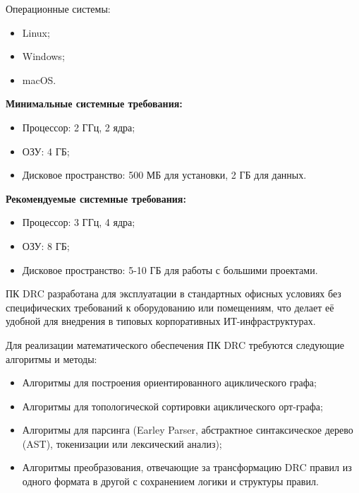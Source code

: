 Операционные системы:

\begin{itemize}
	\item Linux;
	\item Windows;
	\item macOS.
\end{itemize}

\textbf{Минимальные системные требования:}

\begin{itemize}
	\item Процессор: 2 ГГц, 2 ядра;
	\item ОЗУ: 4 ГБ;
	\item Дисковое пространство: 500 МБ для установки, 2 ГБ для данных.
\end{itemize}

\textbf{Рекомендуемые системные требования:}

\begin{itemize}
	\item Процессор: 3 ГГц, 4 ядра;
	\item ОЗУ: 8 ГБ;
	\item Дисковое пространство: 5-10 ГБ для работы с большими проектами.
\end{itemize}
  
ПК DRC разработана для эксплуатации в стандартных офисных условиях
без специфических требований к оборудованию или помещениям,
что делает её удобной для внедрения
в типовых корпоративных ИТ-инфраструктурах. 



Для реализации математического обеспечения ПК DRC
требуются следующие алгоритмы и методы:

\begin{itemize}
	\item Алгоритмы для построения ориентированного ациклического графа;
	\item Алгоритмы для топологической сортировки ациклического орт-графа;
	\item Алгоритмы для парсинга
		(Earley Parser, абстрактное синтаксическое дерево (AST),
		токенизации или лексический анализ);
	\item Алгоритмы преобразования, отвечающие за трансформацию DRC
		правил из одного формата в другой с сохранением логики
		и структуры правил.
\end{itemize}

